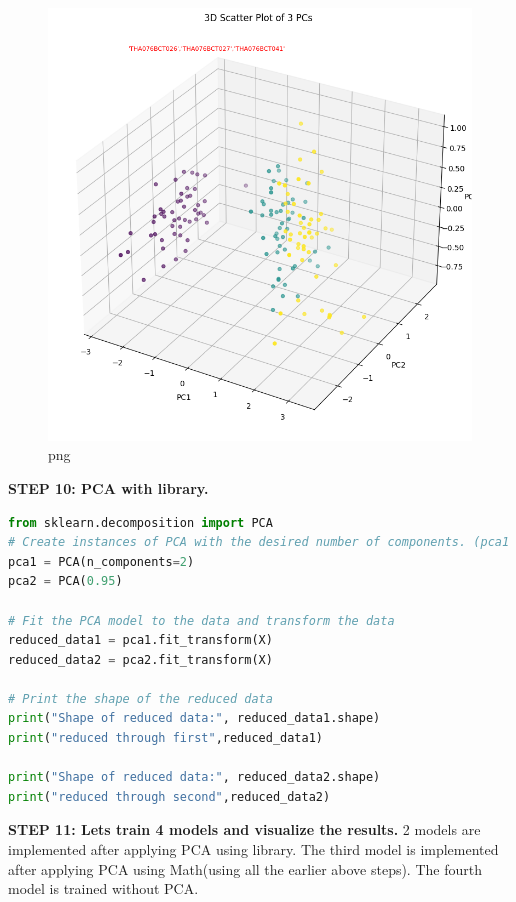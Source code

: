 \documentclass[
]{article}
\begin{document}
\begin{figure}
\centering
\includegraphics{PCA on IRIS_files/PCA on IRIS_55_1.png}
\caption{png}
\end{figure}

\textbf{STEP 10: PCA with library.}

\begin{lstlisting}[language=Python]
from sklearn.decomposition import PCA
# Create instances of PCA with the desired number of components. (pca1 = 2components. pca2=so as to retain 95% info)
pca1 = PCA(n_components=2)
pca2 = PCA(0.95)

# Fit the PCA model to the data and transform the data
reduced_data1 = pca1.fit_transform(X)
reduced_data2 = pca2.fit_transform(X)

# Print the shape of the reduced data
print("Shape of reduced data:", reduced_data1.shape)
print("reduced through first",reduced_data1)

print("Shape of reduced data:", reduced_data2.shape)
print("reduced through second",reduced_data2)
\end{lstlisting}

\textbf{STEP 11: Lets train 4 models and visualize the results.} 2
models are implemented after applying PCA using library. The third model
is implemented after applying PCA using Math(using all the earlier above
steps). The fourth model is trained without PCA.
\end{document}
